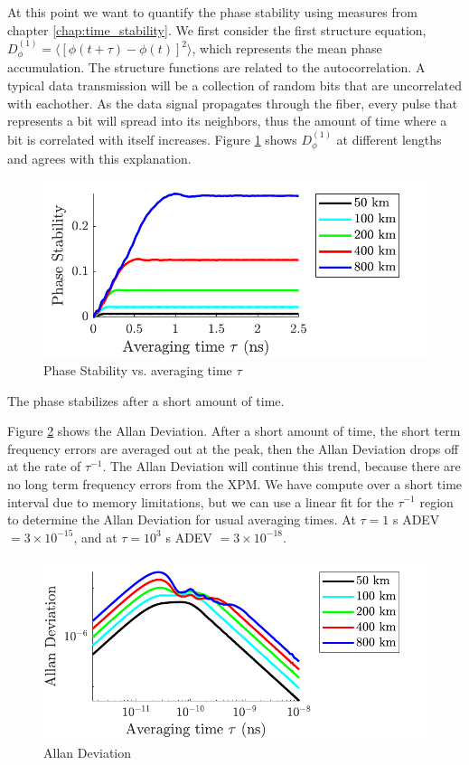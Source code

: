 At this point we want to quantify the phase stability using measures from chapter \ref{chap:time_stability}. We first consider the first structure equation, $D^{(1)}_\phi = \langle [\phi(t+\tau) - \phi(t)]^2 \rangle$, which represents the mean phase accumulation. The structure functions are related to the autocorrelation. A typical data transmission will be a collection of random bits that are uncorrelated with eachother. As the data signal propagates through the fiber, every pulse that represents a bit will spread into its neighbors, thus the amount of time where a bit is correlated with itself increases. Figure \ref{fig:NAPhaseStability} shows $D^{(1)}_\phi$ at different lengths and agrees with this explanation. 
%
\begin{figure}[htb]
	\centering
	\includegraphics{img/NAPhaseStability}
	\caption{Phase Stability vs. averaging time $\tau$} \label{fig:NAPhaseStability}
\end{figure}
%
The phase stabilizes after a short amount of time.

Figure \ref{fig:NAAllanDev} shows the Allan Deviation. After a short amount of time, the short term frequency errors are averaged out at the peak, then the Allan Deviation drops off at the rate of $\tau^{-1}$. The Allan Deviation will continue this trend, because there are no long term frequency errors from the XPM. We have compute over a short time interval due to memory limitations, but we can use a linear fit for the $\tau^{-1}$ region to determine the Allan Deviation for usual averaging times. At $\tau = 1$ s ADEV $= 3\times 10^{-15}$, and at $\tau=10^3$ s ADEV $= 3\times 10^{-18}$.
%
\begin{figure}[htb]
	\centering
	\includegraphics{img/NAAllanDev}
	\caption{Allan Deviation} \label{fig:NAAllanDev}
\end{figure}
%


